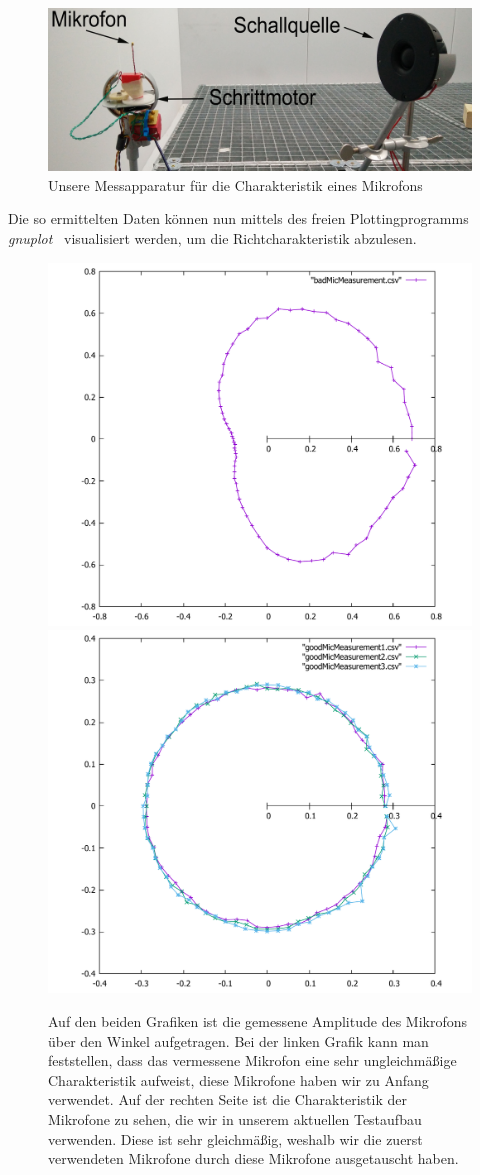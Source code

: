 \begin{figure}[H]
  \centering
  \includegraphics[width=0.8\linewidth]{img/chara_mess}
  \caption{Unsere Messapparatur für die Charakteristik eines Mikrofons}
\end{figure}
Die so ermittelten Daten können nun mittels des freien Plottingprogramms \textit{gnuplot}~\cite{Gnuplot} visualisiert werden, um die Richtcharakteristik abzulesen.
\begin{figure}[H]
  \centering
  \includegraphics[width=0.45\linewidth]{img/badMic}
  \includegraphics[width=0.45\linewidth]{img/goodMic}
  \caption{Auf den beiden Grafiken ist die gemessene Amplitude des Mikrofons über den Winkel aufgetragen. Bei der linken Grafik kann man feststellen, dass das vermessene Mikrofon eine sehr ungleichmäßige Charakteristik aufweist, diese Mikrofone haben wir zu Anfang verwendet. Auf der rechten Seite ist die Charakteristik der Mikrofone zu sehen, die wir in unserem aktuellen Testaufbau verwenden. Diese ist sehr gleichmäßig, weshalb wir die zuerst verwendeten Mikrofone durch diese Mikrofone ausgetauscht haben.}\label{fig:caracter}
\end{figure}

